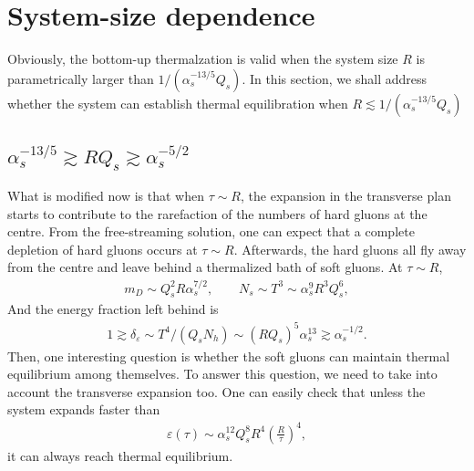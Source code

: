 \documentclass[onecolumn,showpacs,nobibnotes,nofootinbib,12pt]{revtex4-1}
\begin{document}
\section{System-size dependence}

Obviously, the bottom-up thermalzation is valid when the system size $R$ is parametrically larger than $1/(\alpha_s^{-13/5}Q_s)$. In this section, we shall address whether the system can establish thermal equilibration when $R \lesssim 1/(\alpha_s^{-13/5}Q_s)$

\subsection{ $\alpha_s^{-13/5}\gtrsim R Q_s\gtrsim \alpha_s^{-5/2}$}
What is modified now is that when $\tau\sim R$, the expansion in the transverse plan starts to contribute to the rarefaction of the numbers of hard gluons at the centre.  From the free-streaming solution, one can expect that a complete depletion of hard gluons occurs at $\tau\sim R$. Afterwards, the hard gluons all fly away from the centre and leave behind a thermalized bath of soft gluons. At $\tau\sim R$, 
\begin{eqnarray}
	m_D\sim Q_s^2 R \alpha_s^{7/2},\qquad N_s \sim T^3\sim \alpha_s^9 R^3 Q_s^6, 
\end{eqnarray}
And the energy fraction left behind is
\begin{align}
1\gtrsim\delta_\varepsilon\sim T^4/(Q_s N_h)\sim (R Q_s)^5 \alpha_s^{13} \gtrsim \alpha_s^{-1/2}.
\end{align}
Then, one interesting question is whether the soft gluons can maintain thermal equilibrium among themselves. To answer this question, we need to take into account the transverse expansion too. One can easily check that unless the system expands faster than 
\begin{align}
\varepsilon(\tau)\sim \alpha_s^{12} Q_s^8 R^4 \left(\frac{R}{\tau}\right)^4,
\end{align} 
it can always reach thermal equilibrium.
\end{document}
